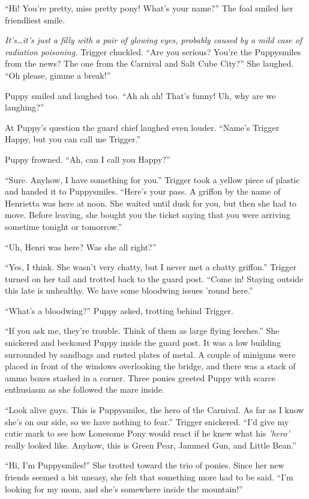 ``Hi! You're pretty, miss pretty pony! What's your name?'' The foal smiled her friendliest smile.

\emph{It's\dots it's just a filly with a pair of glowing eyes, probably caused by a mild case of radiation poisoning.} Trigger chuckled. ``Are you serious? You're the Puppysmiles from the news? The one from the Carnival and Salt Cube City?'' She laughed. ``Oh please, gimme a break!''

Puppy smiled and laughed too. ``Ah ah ah! That's funny! Uh, why are we laughing?''

At Puppy's question the guard chief laughed even louder. ``Name's Trigger Happy, but you can call me Trigger.''

Puppy frowned. ``Ah, can I call you Happy?''

``Sure. Anyhow, I have something for you.'' Trigger took a yellow piece of plastic and handed it to Puppysmiles. ``Here's your pass. A griffon by the name of Henrietta was here at noon. She waited until dusk for you, but then she had to move. Before leaving, she bought you the ticket saying that you were arriving sometime tonight or tomorrow.''

``Uh, Henri was here? Was she all right?''

``Yes, I think. She wasn't very chatty, but I never met a chatty griffon.'' Trigger turned on her tail and trotted back to the guard post. ``Come in! Staying outside this late is unhealthy. We have some bloodwing issues 'round here.''

``What's a bloodwing?'' Puppy asked, trotting behind Trigger.

``If you ask me, they're trouble. Think of them as large flying leeches.'' She snickered and beckoned Puppy inside the guard post. It was a low building surrounded by sandbags and rusted plates of metal. A couple of miniguns were placed in front of the windows overlooking the bridge, and there was a stack of ammo boxes stashed in a corner. Three ponies greeted Puppy with scarce enthusiasm as she followed the mare inside.

``Look alive guys. This is Puppysmiles, the hero of the Carnival. As far as I know she's on our side, so we have nothing to fear.'' Trigger snickered. ``I'd give my cutie mark to see how Lonesome Pony would react if he knew what his \emph{'hero'} really looked like. Anyhow, this is Green Pear, Jammed Gun, and Little Bean.''

``Hi, I'm Puppysmiles!'' She trotted toward the trio of ponies. Since her new friends seemed a bit uneasy, she felt that something more had to be said. ``I'm looking for my mom, and she's somewhere inside the mountain!''

